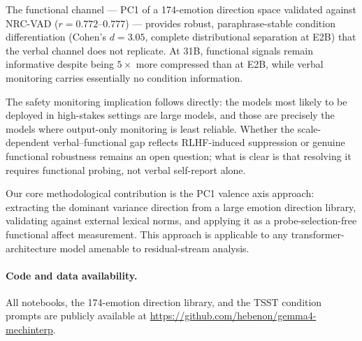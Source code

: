 \documentclass[11pt]{article}
\begin{document}
The functional channel --- PC1 of a 174-emotion direction space validated against NRC-VAD
($r = 0.772$--$0.777$) --- provides robust, paraphrase-stable condition differentiation
(Cohen's $d = 3.05$, complete distributional separation at E2B) that the verbal channel does
not replicate. At 31B, functional signals remain informative despite being $5\times$ more
compressed than at E2B, while verbal monitoring carries essentially no condition information.

The safety monitoring implication follows directly: the models most likely to be deployed in
high-stakes settings are large models, and those are precisely the models where output-only
monitoring is least reliable. Whether the scale-dependent verbal--functional gap reflects
RLHF-induced suppression or genuine functional robustness remains an open question; what is
clear is that resolving it requires functional probing, not verbal self-report alone.

Our core methodological contribution is the PC1 valence axis approach: extracting the dominant
variance direction from a large emotion direction library, validating against external lexical
norms, and applying it as a probe-selection-free functional affect measurement. This approach is
applicable to any transformer-architecture model amenable to residual-stream analysis.

\paragraph{Code and data availability.}
All notebooks, the 174-emotion direction library, and the TSST condition prompts are publicly
available at \url{https://github.com/hebenon/gemma4-mechinterp}.



\end{document}
